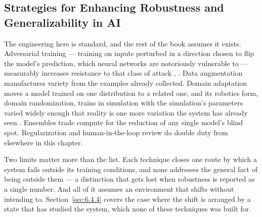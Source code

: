\subsection{Strategies for Enhancing Robustness and Generalizability in AI}
\label{sec:6.2.2}
The engineering here is standard, and the rest of the book assumes it exists. Adversarial training — training on inputs perturbed in a direction chosen to flip the model's prediction, which neural networks are notoriously vulnerable to — measurably increases resistance to that class of attack \autocite{szegedy2013intriguing}, \autocite{goodfellow2014explaining}. Data augmentation manufactures variety from the examples already collected. Domain adaptation moves a model trained on one distribution to a related one, and its robotics form, domain randomization, trains in simulation with the simulation's parameters varied widely enough that reality is one more variation the system has already seen \autocite{tobin2017domain}. Ensembles trade compute for the reduction of any single model's blind spot. Regularization and human-in-the-loop review do double duty from elsewhere in this chapter.

Two limits matter more than the list. Each technique closes one route by which a system fails outside its training conditions, and none addresses the general fact of being outside them — a distinction that gets lost when robustness is reported as a single number. And all of it assumes an environment that shifts without intending to. Section~\ref{sec:6.4.4} covers the case where the shift is arranged by a state that has studied the system, which none of these techniques was built for.
